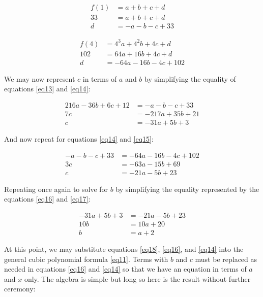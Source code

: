 \documentclass[preview,border=3mm]{article}
\begin{document}
\begin{align}
    f(1) &= a + b + c + d \nonumber \\
    33   &= a + b + c + d \nonumber \\
    d    &= -a - b - c + 33\label{eq14}
\end{align}

\begin{align}
    f(4) &= 4^3a + 4^2b + 4c + d \nonumber \\
    102  &= 64a + 16b + 4c + d \nonumber \\
    d    &= -64a - 16b -4c + 102 \label{eq15}
\end{align}

\noindent
We may now represent $c$ in terms of $a$ and $b$ by simplifying the equality
of equations \ref{eq13} and \ref{eq14}:

\begin{align}
    216a - 36b + 6c + 12 &= -a -b -c + 33 \nonumber \\
    7c &= -217a + 35b + 21 \nonumber \\
    c &= -31a + 5b + 3 \label{eq16}
\end{align}

\noindent
And now repeat for equations \ref{eq14} and \ref{eq15}:

\begin{align}
    -a -b -c + 33 &= -64a -16b -4c + 102 \nonumber \\
    3c &= -63a -15b + 69 \nonumber \\
    c &= -21a -5b + 23 \label{eq17}
\end{align}

\noindent
Repeating once again to solve for $b$ by simplifying the equality represented
by the equations \ref{eq16} and \ref{eq17}:

\begin{align}
    -31a + 5b + 3 &= -21a -5b + 23 \nonumber \\
    10b &= 10a + 20 \nonumber \\
    b &= a + 2 \label{eq18}
\end{align}

\noindent
At this point, we may substitute equations \ref{eq18}, \ref{eq16}, and \ref{eq14}
into the general cubic polynomial formula \ref{eq11}. Terms with $b$ and $c$
must be replaced as needed in equations \ref{eq16} and \ref{eq14} so that we
have an equation in terms of $a$ and $x$ only. The algebra is simple but long
so here is the result without further ceremony:
\end{document}
